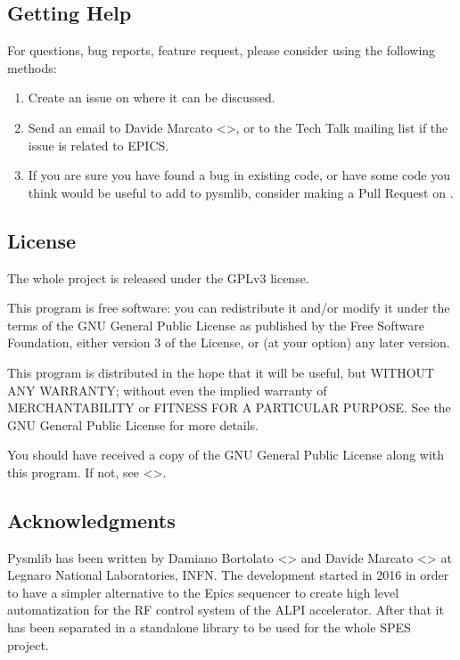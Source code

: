\documentclass[letterpaper,10pt,english]{sphinxmanual}
\begin{document}
\subsection{Getting Help}
\label{\detokenize{installation:getting-help}}
For questions, bug reports, feature request, please consider using the
following methods:
\begin{enumerate}
\item {} 
Create an issue on  where it can be discussed.

\item {} 
Send an email to Davide Marcato \textless{}\textgreater{}, or
to the Tech Talk mailing list if the issue is related to EPICS.

\item {} 
If you are sure you have found a bug in existing code, or have
some code you think would be useful to add to pysmlib, consider
making a Pull Request on .

\end{enumerate}


\subsection{License}
\label{\detokenize{installation:license}}
The whole project is released under the GPLv3 license.

This program is free software: you can redistribute it and/or modify
it under the terms of the GNU General Public License as published by
the Free Software Foundation, either version 3 of the License, or
(at your option) any later version.

This program is distributed in the hope that it will be useful,
but WITHOUT ANY WARRANTY; without even the implied warranty of
MERCHANTABILITY or FITNESS FOR A PARTICULAR PURPOSE.  See the
GNU General Public License for more details.

You should have received a copy of the GNU General Public License
along with this program.  If not, see \textless{}\textgreater{}.


\subsection{Acknowledgments}
\label{\detokenize{installation:acknowledgments}}
Pysmlib has been written by Damiano Bortolato \textless{}\textgreater{}
and Davide Marcato \textless{}\textgreater{} at Legnaro National Laboratories,
INFN. The development started in 2016 in order to have a simpler alternative to
the Epics sequencer to create high level automatization for the RF control
system of the ALPI accelerator. After that it has been separated in a standalone library to be used for the whole SPES project.
\end{document}
